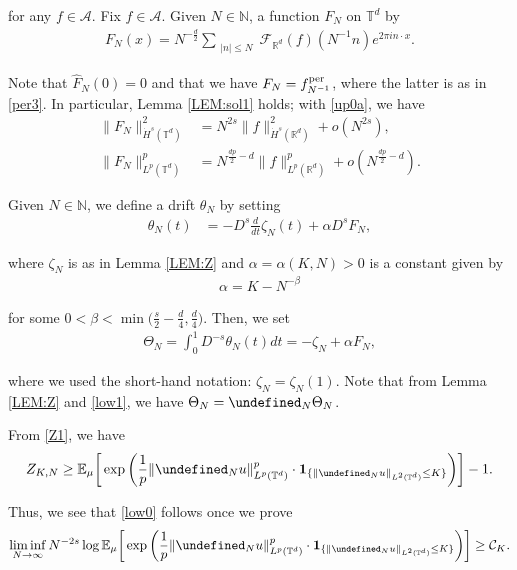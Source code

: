 \documentclass[letterpaper, 11pt,  reqno]{amsart}
\newcommand{\noi}{\noindent}
\newcommand{\R}{\mathbb{R}}
\newcommand{\T}{\mathbb{T}}
\let\P= \undefined
\newcommand{\P}{\mathbf{P}}
\newcommand{\E}{\mathbb{E}}
\newcommand{\F}{\mathcal{F}}
\newcommand{\al}{\alpha}
\newcommand{\be}{\beta}
\newcommand{\ft}{\widehat}
\newcommand{\ind}{\mathbf 1}
\newcommand{\N}{\mathbb{N}}
\numberwithin{equation}{section}
\numberwithin{theorem}{section}
\newcommand{\ze}{\zeta}
\newcommand{\CC}{\mathcal{C}}
\newcommand{\dr}{\theta}
\newcommand{\Dr}{\Theta}
\newcommand{\per}{\textup{per}}
\begin{document}
\noi
for any $f \in \mathcal{A}$.
Fix
 $f \in \mathcal{A}$.
Given $N \in \N$, 
 a function $F_N$  on $\T^d$ by 
\begin{align}
F_N (x) =  N^{-\frac d 2} \sum_{\substack{|n| \le N}} \F_{\R^d}(f)(N^{-1} n) e^{2\pi i n \cdot x}.
\label{low1} 
\end{align}

\noi
Note that $\ft F_N(0) = 0$ and that we have $F_N = f_{N^{-1}}^\per$, 
where the latter is as in 
\eqref{per3}.
In particular, Lemma \ref{LEM:sol1} holds; 
with \eqref{up0a}, we have 
\begin{align}
\| F_N  \|^2_{\dot{H}^s (\mathbb{T}^d)}
&=  N^{2s} \| f \|^2_{\dot H^{s} (\R^d)} + o(N^{2s}), 
\label{low2}\\
\| F_N  \|_{L^p (\mathbb{T}^d)}^p &=
N^{\frac {dp}2 - d } \| f \|^p_{L^p (\R^d)} + o (N^{\frac {dp}2 - d}).
  \label{low3}
\end{align}



 
Given $N \in \N$, we define  a drift $\dr_N$ by setting
\begin{align}
\dr_N (t) 
& = -D^{s}\frac{d}{dt} \ze_N(t) + \alpha D^s F_N , 
\label{low2a}
\end{align}

\noi
where 
$\ze_N$ is as in Lemma \ref{LEM:Z}
and 
$\alpha = \al(K, N)> 0$ is a constant given by 
\begin{align}
\alpha=K- N^{-\be}
\label{low4}
\end{align}

\noi
for some  $0<\be < \min\big(\frac s2 - \frac d4, \frac d4 \big)$.
Then, we  set 
\begin{align}\label{low5}
\Dr_{N}=
\int_0^1 D^{- s} \theta_N (t) dt
= 
-\ze_N
+ 
\alpha F_N, 
\end{align}


\noi
where we used the short-hand notation: $\ze_N = \ze_N(1)$.
Note that
from Lemma \ref{LEM:Z} and \eqref{low1}, we have 
$\Dr_N = \P_{N}\Dr_{N}$.

From  \eqref{Z1}, 
we have 
\begin{align}
  Z_{K, N}
\ge \E_{\mu}\bigg[ 
\exp\bigg( \frac 1 p \| \P_N u\|^p_{L^p(\T^d)} \cdot 
 \ind_{\{ \| \P_{N} u \|_{L^2 (\mathbb{T}^d)}\leq K \}}\bigg)\bigg]-1.
\label{low5a}
\end{align}

\noi
Thus, we see that  \eqref{low0} follows once we prove 
\begin{align}
\liminf_{N\to \infty}
N^{-2s} 
\log \E_{\mu}\bigg[ 
\exp\bigg( \frac 1 p \| \P_N u\|^p_{L^p(\T^d)} \cdot 
 \ind_{\{ \| \P_{N} u \|_{L^2 (\mathbb{T}^d)}\leq K \}}\bigg)\bigg] \ge \CC_K.
\label{low5b}
\end{align}
\end{document}
